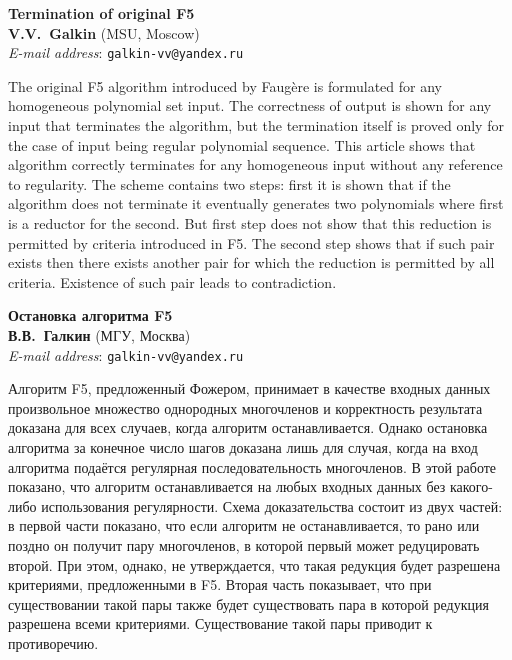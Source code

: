 \documentclass[A4, 12pt, twoside]{article}
\begin{document}
\begin{center} \textbf{
  Termination of original F5 \\[.3cm]
	V.V.~Galkin}  (MSU, Moscow) \\
	\emph{E-mail address}: \texttt{galkin-vv@yandex.ru}\\[.3cm]
\end{center}
\normalsize

The original F5 algorithm introduced by Faug\`ere is formulated for
any homogeneous polynomial set input. The correctness of output is
shown for any input that terminates the algorithm, but the termination
itself is proved only for the case of input being regular polynomial
sequence. This article shows that algorithm correctly terminates for
any homogeneous input without any reference to regularity. The scheme
contains two steps: first it is shown that if the algorithm does not
terminate it eventually generates two polynomials where first is a
reductor for the second. But first step does not show that this reduction
is permitted by criteria introduced in F5. The second step shows that
if such pair exists then there exists another pair for which the reduction
is permitted by all criteria. Existence of such pair leads to contradiction.




\begin{center} \textbf{
	Остановка алгоритма F5 \\[.3cm]
	В.В.~Галкин}  (МГУ, Москва) \\
	\emph{E-mail address}: \texttt{galkin-vv@yandex.ru}\\[.3cm]
\end{center}
\normalsize
Алгоритм F5, предложенный Фожером, принимает в качестве входных данных
произвольное множество однородных многочленов и корректность результата
доказана для всех случаев, когда алгоритм останавливается. Однако
остановка алгоритма за конечное число шагов доказана лишь для случая,
когда на вход алгоритма подаётся регулярная последовательность многочленов.
В этой работе показано, что алгоритм останавливается на любых входных
данных без какого-либо использования регулярности. Схема доказательства
состоит из двух частей: в первой части показано, что если алгоритм
не останавливается, то рано или поздно он получит пару многочленов,
в которой первый может редуцировать второй. При этом, однако, не утверждается,
что такая редукция будет разрешена критериями, предложенными в F5.
Вторая часть показывает, что при существовании такой пары также будет
существовать пара в которой редукция разрешена всеми критериями. Существование
такой пары приводит к противоречию.
\end{document}
